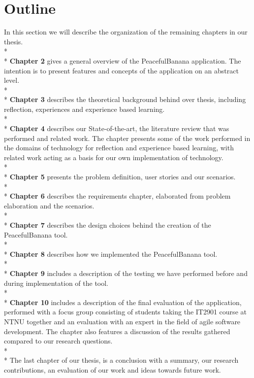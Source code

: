\section{Outline}
In this section we will describe the organization of the remaining chapters in our thesis. 
\\*
\\*
\textbf{Chapter 2} gives a general overview of the PeacefulBanana application. The intention is to present features and concepts of the application on an abstract level.
\\*
\\*
\textbf{Chapter 3} describes the theoretical background behind over thesis, including reflection, experiences and experience based learning. 
\\*
\\*
\textbf{Chapter 4} describes our State-of-the-art, the literature review that was performed and related work. The chapter presents some of the work performed in the domains of technology for reflection and experience based learning, with related work acting as a basis for our own implementation of technology. 
\\*
\\*
\textbf{Chapter 5} presents the problem definition, user stories and our scenarios. 
\\*
\\*
\textbf{Chapter 6} describes the requirements chapter, elaborated from problem elaboration and the scenarios. 
\\*
\\*
\textbf{Chapter 7} describes the design choices behind the creation of the PeacefulBanana tool.
\\*
\\*
\textbf{Chapter 8} describes how we implemented the PeacefulBanana tool. 
\\*
\\*
\textbf{Chapter 9} includes a description of the testing we have performed before and during implementation of the tool. 
\\*
\\*
\textbf{Chapter 10} includes a description of the final evaluation of the application, performed with a focus group consisting of students taking the IT2901 course at NTNU together and an evaluation with an expert in the field of agile software development. The chapter also features a discussion of the results gathered compared to our research questions. 
\\*
\\*
The last chapter of our thesis, is a conclusion with a summary, our research contributions, an evaluation of our work and ideas towards future work.